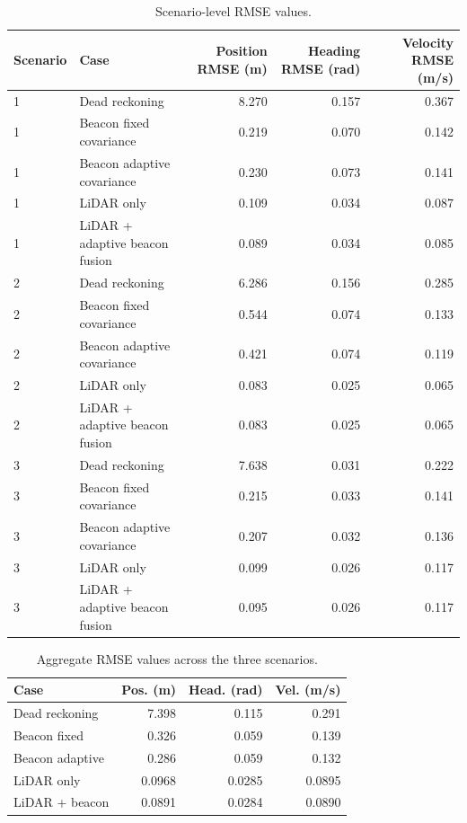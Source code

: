 \begin{table}
\centering
\caption{Scenario-level RMSE values.}
\label{tab:rmse}
\begin{tabular}{llrrr}
\toprule
Scenario & Case & Position RMSE (m) & Heading RMSE (rad) & Velocity RMSE (m/s)\\
\midrule
1 & Dead reckoning & 8.270 & 0.157 & 0.367\\
1 & Beacon fixed covariance & 0.219 & 0.070 & 0.142\\
1 & Beacon adaptive covariance & 0.230 & 0.073 & 0.141\\
1 & LiDAR only & 0.109 & 0.034 & 0.087\\
1 & LiDAR + adaptive beacon fusion & 0.089 & 0.034 & 0.085\\
2 & Dead reckoning & 6.286 & 0.156 & 0.285\\
2 & Beacon fixed covariance & 0.544 & 0.074 & 0.133\\
2 & Beacon adaptive covariance & 0.421 & 0.074 & 0.119\\
2 & LiDAR only & 0.083 & 0.025 & 0.065\\
2 & LiDAR + adaptive beacon fusion & 0.083 & 0.025 & 0.065\\
3 & Dead reckoning & 7.638 & 0.031 & 0.222\\
3 & Beacon fixed covariance & 0.215 & 0.033 & 0.141\\
3 & Beacon adaptive covariance & 0.207 & 0.032 & 0.136\\
3 & LiDAR only & 0.099 & 0.026 & 0.117\\
3 & LiDAR + adaptive beacon fusion & 0.095 & 0.026 & 0.117\\
\bottomrule
\end{tabular}
\end{table}

\begin{table}
\centering
\caption{Aggregate RMSE values across the three scenarios.}
\label{tab:aggregate}
\begin{tabular}{lrrr}
\toprule
Case & Pos. (m) & Head. (rad) & Vel. (m/s)\\
\midrule
Dead reckoning & 7.398 & 0.115 & 0.291\\
Beacon fixed & 0.326 & 0.059 & 0.139\\
Beacon adaptive & 0.286 & 0.059 & 0.132\\
LiDAR only & 0.0968 & 0.0285 & 0.0895\\
LiDAR + beacon & 0.0891 & 0.0284 & 0.0890\\
\bottomrule
\end{tabular}
\end{table}

